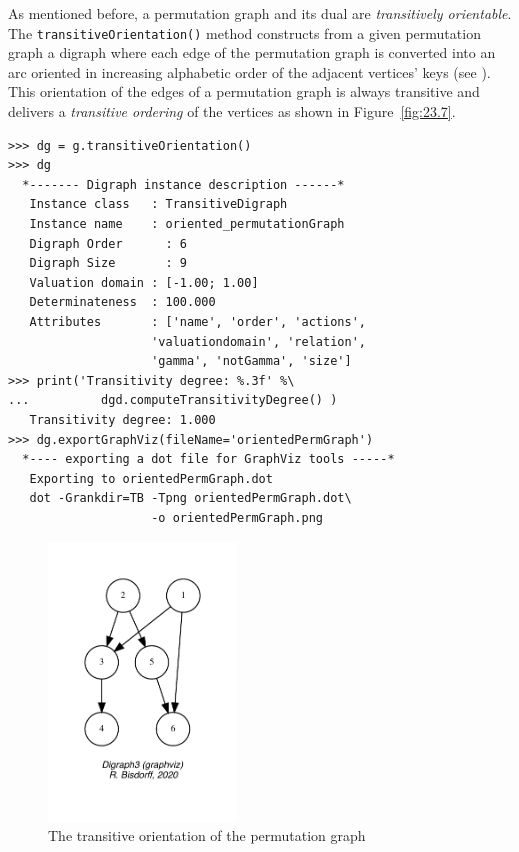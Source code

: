 As mentioned before, a permutation graph and its dual are \emph{transitively orientable}. The \texttt{transitiveOrientation()} method constructs from a given permutation graph a digraph where each edge of the permutation graph is converted into an arc oriented in increasing alphabetic order of the adjacent vertices' keys (see \citealp{GOL-2004}). This orientation of the edges of a permutation graph is always transitive and delivers a \emph{transitive ordering} of the vertices as shown in Figure~\vref{fig:23.7}.
\begin{lstlisting}
>>> dg = g.transitiveOrientation()
>>> dg
  *------- Digraph instance description ------*
   Instance class   : TransitiveDigraph
   Instance name    : oriented_permutationGraph
   Digraph Order      : 6
   Digraph Size       : 9
   Valuation domain : [-1.00; 1.00]
   Determinateness  : 100.000
   Attributes       : ['name', 'order', 'actions',
                    'valuationdomain', 'relation',
                    'gamma', 'notGamma', 'size']
>>> print('Transitivity degree: %.3f' %\
...          dgd.computeTransitivityDegree() ) 
   Transitivity degree: 1.000
>>> dg.exportGraphViz(fileName='orientedPermGraph')
  *---- exporting a dot file for GraphViz tools -----*
   Exporting to orientedPermGraph.dot
   dot -Grankdir=TB -Tpng orientedPermGraph.dot\
                    -o orientedPermGraph.png
\end{lstlisting}
\begin{figure}[ht]
\sidecaption[t]
\includegraphics[width=5cm]{Figures/23-7-orientedPermGraph.pdf}
\caption{The transitive orientation of the permutation graph} 
\label{fig:23.7}       %
\end{figure}

